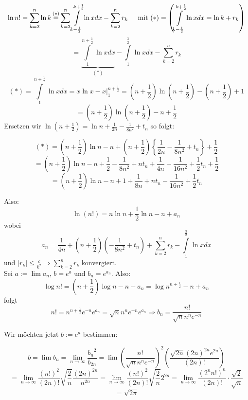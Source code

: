 \[\ln n! = \sum\limits_{k = 2}^n {\ln k\mathop  = \limits^{( * )} \sum\limits_{k = 2}^n {\int\limits_{k - \frac{1}{2}}^{k + \frac{1}{2}} {\ln xdx} }  - \sum\limits_{k = 2}^n {{r_k}} } \text{\hspace{4mm} mit }( * )=\left( {\int\limits_{k - \frac{1}{2}}^{k + \frac{1}{2}} {\ln xdx = \ln k + {r_k}} } \right) \]
\[ = \underbrace {\int\limits_1^{n + \frac{1}{2}} {\ln xdx} }_{( * )} - \int\limits_1^{\frac{3}{2}} {\ln xdx - \sum\limits_{k = 2}^n {{r_k}} } \]
\[( * ) = \int\limits_1^{n + \frac{1}{2}} {\ln xdx = \left. {x\ln x - x} \right|_1^{n + \frac{1}{2}}}  = \left( {n + \frac{1}{2}} \right)\ln \left( {n + \frac{1}{2}} \right) - \left( {n + \frac{1}{2}} \right) + 1\]
\[ = \left( {n + \frac{1}{2}} \right)\ln \left( {n + \frac{1}{2}} \right) - n + \frac{1}{2}\]
Ersetzen wir $\ln \left( {n + \frac{1}{2}} \right) = \ln n + \frac{1}{{2n}} - \frac{1}{{8{n^2}}} + {t_n}$ so folgt:

\[(*) = \left( {n + \frac{1}{2}} \right)\ln n - n + \left( {n + \frac{1}{2}} \right)\left\{ {\frac{1}{{2n}} - \frac{1}{{8{n^2}}} + {t_n}} \right\} + \frac{1}{2}\]
\[ = \left( {n + \frac{1}{2}} \right)\ln n - n + \frac{1}{2} - \frac{1}{{8{n^2}}} + n{t_n} + \frac{1}{{4n}} - \frac{1}{{16{n^2}}} + \frac{1}{2}{t_n} + \frac{1}{2}\]
\[ = \left( {n + \frac{1}{2}} \right)\ln n - n + 1 + \frac{1}{{8n}} + n{t_n} - \frac{1}{{16{n^2}}} + \frac{1}{2}{t_n}\]

\noindent Also:
\[\ln (n!) = n\ln n + \frac{1}{2}\ln n - n + {a_n}\]
wobei
\[{a_n} = {\frac{1}{{4n}} + \left( {n + \frac{1}{2}} \right)\left( { - \frac{1}{{8{n^2}}} + {t_n}} \right)} + \sum\limits_{k = 2}^n {{r_k} - \int\limits_1^{\frac{3}{2}} {\ln xdx} } \]
und $\left| {{r_k}} \right| \le \frac{c}{{{k^2}}} \Rightarrow \sum\limits_{k = 2}^n {{r_k}} $ konvergiert.\\

\noindent Sei $a:=\lim a_n$, $b=e^a$ und $b_n=e^{a_n}$. Also:
\[\log n! = \left( {n + \frac{1}{2}} \right)\log n - n + {a_n} = \log {n^{n + \frac{1}{2}}} - n + {a_n}\]
folgt 
\[n! = {n^{n + \frac{1}{2}}}{e^{ - n}}{e^{{a_n}}} = \sqrt n {n^n}{e^{ - n}}{e^{{a_n}}} \Rightarrow {b_n} = \frac{{n!}}{{\sqrt n {n^n}{e^{ - n}}}}\]

\noindent Wir möchten jetzt $b:=e^a$ bestimmen:

\[b = \lim {b_n} = \mathop {\lim }\limits_{n \to \infty } \frac{{{b_n}^2}}{{{b_{2n}}}} = \lim {\left( {\frac{{n!}}{{\sqrt n {n^n}{e^{ - n}}}}} \right)^2}\left( {\frac{{\sqrt {2n} {{(2n)}^{2n}}{e^{2n}}}}{{(2n)!}}} \right)\]
\[ = \mathop {\lim }\limits_{n \to \infty } \frac{{{{(n!)}^2}}}{{(2n)!}}\sqrt {\frac{2}{n}} \frac{{{{(2n)}^{2n}}}}{{{n^{2n}}}} = \mathop {\lim }\limits_{n \to \infty } \frac{{{{(n!)}^2}}}{{(2n)!}}\sqrt {\frac{2}{n}} {2^{2n}} = \mathop {\lim }\limits_{n \to \infty } \frac{{{{({2^n}n!)}^n}}}{{(2n)!}} \cdot \frac{{\sqrt 2 }}{{\sqrt n }}\]
\[ = \sqrt {2\pi} \]

